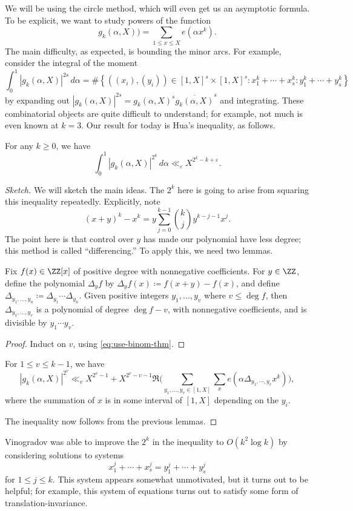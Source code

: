 \documentclass[../notes.tex]{subfiles}
\begin{document}
We will be using the circle method, which will even get us an asymptotic formula. To be explicit, we want to study powers of the function
\[g_k(\alpha,X))=\sum_{1\le x\le X}e\left(\alpha x^k\right).\]
The main difficulty, as expected, is bounding the minor arcs. For example, consider the integral of the moment
\[\int_0^1\left|g_k(\alpha,X)\right|^{2s}\,d\alpha=\#\left\{((x_i),(y_i))\in[1,X]^s\times[1,X]^s:x_1^k+\cdots+x_s^k:y_1^k+\cdots+y_s^k\right\}\]
by expanding out $\left|g_k(\alpha,X)\right|^{2s}=g_k(\alpha,X)^s\overline{g_k(\alpha,X)}^s$ and integrating. These combinatorial objects are quite difficult to understand; for example, not much is even known at $k=3$. Our result for today is Hua's inequality, as follows.
\begin{theorem}
	For any $k\ge0$, we have
	\[\int_0^1\left|g_k(\alpha,X)\right|^{2^k}\,d\alpha\ll_\varepsilon X^{2^k-k+\varepsilon}.\]
\end{theorem}
\begin{proof}[Sketch]
	We will sketch the main ideas. The $2^k$ here is going to arise from squaring this inequality repeatedly. Explicitly, note
	\begin{equation}
		(x+y)^k-x^k=y\sum_{j=0}^{k-1}\binom kjy^{k-j-1}x^j. \label{eq:use-binom-thm}
	\end{equation}
	The point here is that control over $y$ has made our polynomial have less degree; this method is called ``differencing.'' To apply this, we need two lemmas.
	\begin{lemma}
		Fix $f(x)\in\ZZ[x]$ of positive degree with nonnegative coefficients. For $y\in\ZZ$, define the polynomial $\Delta_yf$ by $\Delta_yf(x)\coloneqq f(x+y)-f(x)$, and define $\Delta_{y_1,\ldots,y_n}\coloneqq\Delta_{y_1}\cdots\Delta_{y_n}$. Given positive integers $y_1,\ldots,y_v$ where $v\le\deg f$, then $\Delta_{y_1,\ldots,y_v}$ is a polynomial of degree $\deg f-v$, with nonnegative coefficients, and is divisible by $y_1\cdots y_v$.
	\end{lemma}
	\begin{proof}
		Induct on $v$, using \eqref{eq:use-binom-thm}.
	\end{proof}
	\begin{lemma}
		For $1\le v\le k-1$, we have
		\[\left|g_k(\alpha,X)\right|^{2^v}\ll_vX^{2^v-1}+X^{2^v-v-1}\Re\Bigg(\sum_{y_1,\ldots,y_v\in[1,X]}\sum_xe\left(\alpha\Delta_{y_1,\cdots,y_v}x^k\right)\Bigg),\]
		where the summation of $x$ is in some interval of $[1,X]$ depending on the $y_i$.
	\end{lemma}
	The inequality now follows from the previous lemmas.
\end{proof}
\begin{remark}
	Vinogradov was able to improve the $2^k$ in the inequality to $O\left(k^2\log k\right)$ by considering solutions to systems
	\[x_1^j+\cdots+x_s^j=y_1^j+\cdots+y_s^j\]
	for $1\le j\le k$. This system appears somewhat unmotivated, but it turns out to be helpful; for example, this system of equations turns out to satisfy some form of translation-invariance.
\end{remark}
\end{document}

